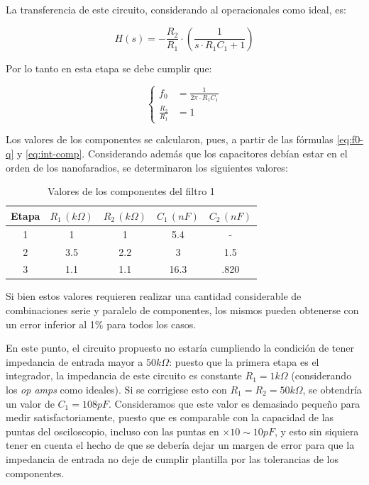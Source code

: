 \documentclass[../../tc_tp5_main.tex]{subfiles}
\begin{document}
La transferencia de este circuito, considerando al operacionales como ideal, es:

\begin{equation}
	H(s) = - \frac{R_2}{R_1} \cdot \left(\frac{1}{s \cdot R_1 C_1 + 1}\right)
\end{equation}

Por lo tanto en esta etapa se debe cumplir que:

\begin{equation}
	\left\{
 	\begin{aligned}
 		f_0 &= \frac{1}{2\pi \cdot R_1 C_1} \\
 		\frac{R_2}{R_1} &= 1
	\end{aligned}
	\right.
	\label{eq:int-comp}
\end{equation}

Los valores de los componentes se calcularon, pues, a partir de las f\'ormulas \ref{eq:f0-q} y \ref{eq:int-comp}. Considerando adem\'as que los capacitores deb\'ian estar en el orden de los nanofaradios, se determinaron los siguientes valores:

\begin{table}[H]
	\centering
	\begin{tabular}{|c||c|c|c|c|}
	\hline
	Etapa & $R_1\, (k\Omega)$ & $R_2\, (k\Omega)$ & $C_1\, (nF)$ & $C_2\, (nF)$ \\ \hline \hline
	1     & 1                 & 1                 & 5.4          & -            \\ \hline
	2     & 3.5               & 2.2               & 3            & 1.5          \\ \hline
	3     & 1.1               & 1.1               & 16.3         & .820         \\ \hline
	\end{tabular}
	\caption{Valores de los componentes del filtro 1}
\end{table}

Si bien estos valores requieren realizar una cantidad considerable de combinaciones serie y paralelo de componentes, los mismos pueden obtenerse con un error inferior al 1\% para todos los casos.\par 

En este punto, el circuito propuesto no estar\'ia cumpliendo la condici\'on de tener impedancia de entrada mayor a $50k\Omega$: puesto que la primera etapa es el integrador, la impedancia de este circuito es constante $R_1 = 1k\Omega$ (considerando los \textit{op amps} como ideales). Si se corrigiese esto con $R_1 = R_2 = 50k\Omega$, se obtendr\'ia un valor de $C_1 = 108pF$. Consideramos que este valor es demasiado peque\~no para medir satisfactoriamente, puesto que es comparable con la capacidad de las puntas del osciloscopio, incluso con las puntas en $\times 10 \sim 10pF$, y esto sin siquiera tener en cuenta el hecho de que se deber\'ia dejar un margen de error para que la impedancia de entrada no deje de cumplir plantilla por las tolerancias de los componentes.\par
\end{document}
